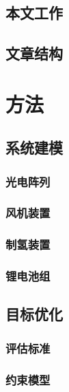 \documentclass{HEBUTMaster}   %
\begin{document}
\section{本文工作}

\section{文章结构}


\chapter{方法}
\section{系统建模}

\subsection{光电阵列}

\subsection{风机装置}

\subsection{制氢装置}

\subsection{锂电池组}

\section{目标优化}

\subsection{评估标准}

\subsection{约束模型}
\end{document}
